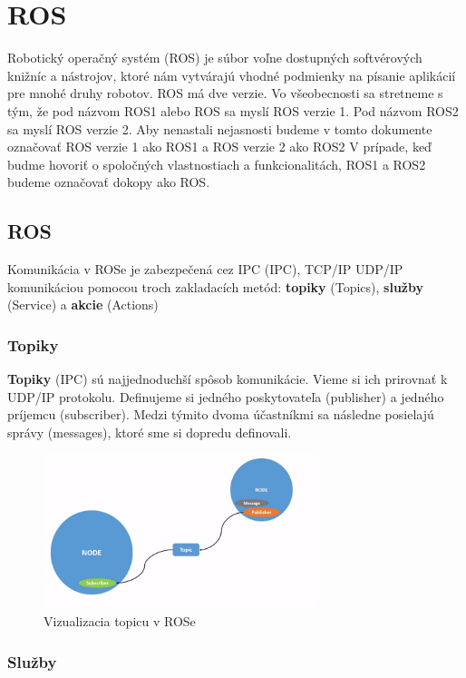 \section{ROS}
\noindent Robotický operačný systém (\acrlong{ROS}) je súbor voľne dostupných softvérových knižníc a nástrojov, ktoré nám vytvárajú
vhodné podmienky na písanie aplikácií pre mnohé druhy robotov. ROS má dve verzie. Vo všeobecnosti sa stretneme s tým, že pod názvom
ROS1 alebo ROS sa myslí ROS verzie 1. Pod názvom ROS2 sa myslí ROS verzie 2. Aby nenastali nejasnosti budeme v tomto dokumente
označovať ROS verzie 1 ako ROS1 a ROS verzie 2 ako ROS2 V prípade, keď budme hovoriť o spoločných vlastnostiach a funkcionalitách,
ROS1 a ROS2 budeme označovať dokopy ako ROS.

\subsection{ROS}

\noindent Komunikácia v ROSe je zabezpečená cez IPC (\acrlong{IPC}), TCP/IP UDP/IP komunikáciou pomocou troch zakladacích metód:
\textbf{topiky} (Topics), \textbf{služby} (Service) a \textbf{akcie} (Actions)

\subsubsection{Topiky}

\textbf {Topiky} (IPC) sú najjednoduchší spôsob komunikácie. Vieme si ich prirovnať k UDP/IP protokolu. Definujeme si jedného poskytovateľa (publisher)
a jedného príjemcu (subscriber). Medzi týmito dvoma účastníkmi sa následne posielajú správy (messages), ktoré sme si dopredu definovali.

\begin{figure}[h]
	\centering
	\includegraphics[width=8cm]{img/topicsExplanation.png}
	\caption{Vizualizacia topicu v ROSe \cite{RosDoc}}
	\label{o_topics}
\end{figure}

\subsubsection{Služby}

